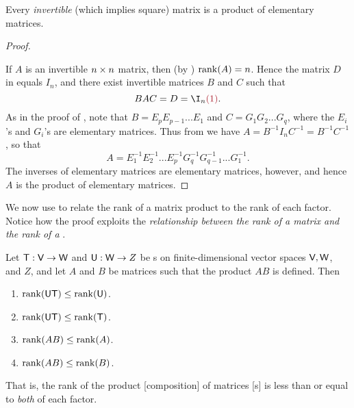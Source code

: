 \begin{corollary} \label{corollary 3.6.3}
Every \emph{invertible} (which implies square) matrix is a product of elementary matrices.
\end{corollary}

\begin{proof} \ 

If \(A\) is an invertible \(n \times n\) matrix, then (by ) \(\mathrm{rank}(A) = n\).
Hence the matrix \(D\) in  equals \(I_n\), and there exist invertible matrices \(B\) and
\(C\) such that
\[
    BAC = D = \I_n \MAROON{(1)}.
\]
As in the proof of , note that \(B = E_p E_{p - 1} ... E_1\) and \(C = G_1 G_2 ... G_q\), where the \(E_i\)'s and \(G_i\)'s are elementary matrices.
Thus from  we have \(A = B^{-1} I_n C^{-1} = B^{-1} C^{-1}\),
so that
\[
    A = E_1^{-1} E_2^{-1} ... E_p^{-1} G_q^{-1} G_{q - 1}^{-1} ... G_1^{-1}.
\]
The inverses of elementary matrices are elementary matrices, however, and hence \(A\) is the product of elementary matrices.
\end{proof}

We now use  to relate the rank of a matrix product to the rank of each factor.
Notice how the proof exploits the \emph{relationship between the rank of a matrix and the rank of a \LTRAN{}}.

\begin{theorem} \label{thm 3.7}
Let \(\textsf{T} : \textsf{V} \to \textsf{W}\) and \(\textsf{U} : \textsf{W} \to Z\) be \LTRAN{}s on finite-dimensional vector spaces \(\textsf{V}, \textsf{W}\), and \(Z\), and let \(A\) and \(B\) be matrices such that the product \(AB\) is defined.
Then
\begin{enumerate}
\item \(\mathrm{rank}(\textsf{U}\textsf{T}) \le \mathrm{rank}(\textsf{U})\).
\item \(\mathrm{rank}(\textsf{U}\textsf{T}) \le \mathrm{rank}(\textsf{T})\).
\item \(\mathrm{rank}(AB) \le \mathrm{rank}(A)\).
\item \(\mathrm{rank}(AB) \le \mathrm{rank}(B)\).
\end{enumerate}
That is, the rank of the product [composition] of matrices [\LTRAN{}s] is less than or equal to \emph{both} of each factor.
\end{theorem}

